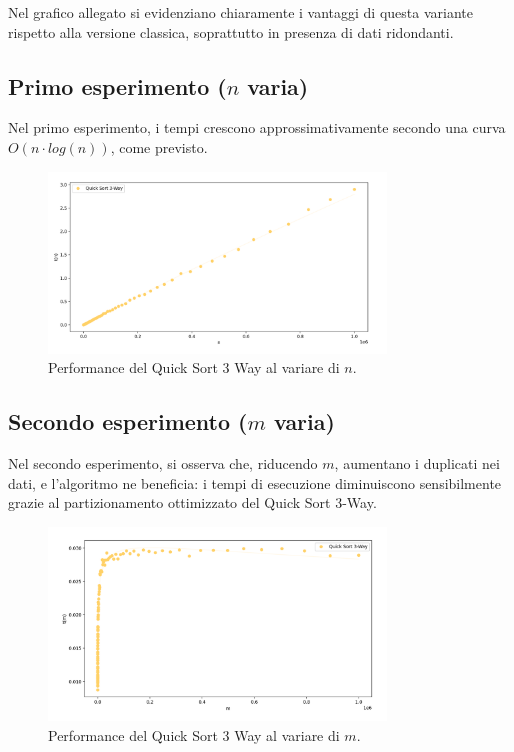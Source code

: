 \documentclass[a4paper, 12pt, oneside]{book}
\begin{document}
\noindent
Nel grafico allegato si evidenziano chiaramente i vantaggi di questa variante rispetto alla versione classica, soprattutto in presenza di dati ridondanti.

\subsection{Primo esperimento ($n$ varia)}

Nel primo esperimento, i tempi crescono approssimativamente secondo una curva \(O(n \cdot log(n))\), come previsto.


\begin{figure}[H]
    \centering
    \includegraphics[width=0.8\textwidth]{images/grafico_quick_sort_3_way_n.png}
    \caption{Performance del Quick Sort 3 Way al variare di \(n\).}
    \label{fig:quick_sort_3_way_n}
\end{figure}



\subsection{Secondo esperimento ($m$ varia)}

Nel secondo esperimento, si osserva che, riducendo \(m\), aumentano i duplicati nei dati, e l'algoritmo ne beneficia: i tempi di esecuzione diminuiscono sensibilmente grazie al partizionamento ottimizzato del Quick Sort 3-Way.

\begin{figure}[H]
    \centering
    \includegraphics[width=0.8\textwidth]{images/grafico_quick_sort_3_way_m.png}
    \caption{Performance del Quick Sort 3 Way al variare di \(m\).}
    \label{fig:quick_sort_3_way_m}
\end{figure}
\end{document}
